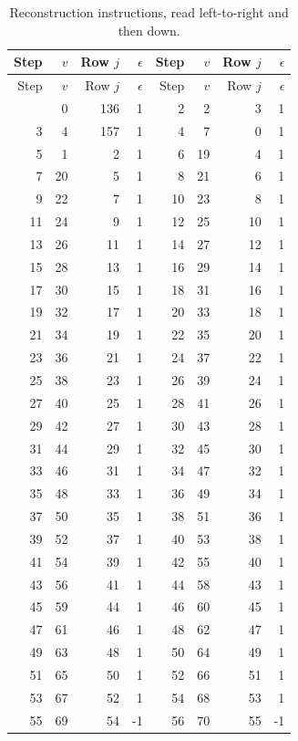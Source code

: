 \begin{longtable}{rrrr@{\qquad}rrrr}
\caption{Reconstruction instructions, read left-to-right and then down.}\label{tab:pivots}\\
\toprule
Step & $v$ & Row $j$ & $\epsilon$ & Step & $v$ & Row $j$ & $\epsilon$\\
\midrule\endfirsthead
\toprule
Step & $v$ & Row $j$ & $\epsilon$ & Step & $v$ & Row $j$ & $\epsilon$\\
\midrule\endhead
\bottomrule\endfoot
1 & 0 & 136 & 1 & 2 & 2 & 3 & 1\\
3 & 4 & 157 & 1 & 4 & 7 & 0 & 1\\
5 & 1 & 2 & 1 & 6 & 19 & 4 & 1\\
7 & 20 & 5 & 1 & 8 & 21 & 6 & 1\\
9 & 22 & 7 & 1 & 10 & 23 & 8 & 1\\
11 & 24 & 9 & 1 & 12 & 25 & 10 & 1\\
13 & 26 & 11 & 1 & 14 & 27 & 12 & 1\\
15 & 28 & 13 & 1 & 16 & 29 & 14 & 1\\
17 & 30 & 15 & 1 & 18 & 31 & 16 & 1\\
19 & 32 & 17 & 1 & 20 & 33 & 18 & 1\\
21 & 34 & 19 & 1 & 22 & 35 & 20 & 1\\
23 & 36 & 21 & 1 & 24 & 37 & 22 & 1\\
25 & 38 & 23 & 1 & 26 & 39 & 24 & 1\\
27 & 40 & 25 & 1 & 28 & 41 & 26 & 1\\
29 & 42 & 27 & 1 & 30 & 43 & 28 & 1\\
31 & 44 & 29 & 1 & 32 & 45 & 30 & 1\\
33 & 46 & 31 & 1 & 34 & 47 & 32 & 1\\
35 & 48 & 33 & 1 & 36 & 49 & 34 & 1\\
37 & 50 & 35 & 1 & 38 & 51 & 36 & 1\\
39 & 52 & 37 & 1 & 40 & 53 & 38 & 1\\
41 & 54 & 39 & 1 & 42 & 55 & 40 & 1\\
43 & 56 & 41 & 1 & 44 & 58 & 43 & 1\\
45 & 59 & 44 & 1 & 46 & 60 & 45 & 1\\
47 & 61 & 46 & 1 & 48 & 62 & 47 & 1\\
49 & 63 & 48 & 1 & 50 & 64 & 49 & 1\\
51 & 65 & 50 & 1 & 52 & 66 & 51 & 1\\
53 & 67 & 52 & 1 & 54 & 68 & 53 & 1\\
55 & 69 & 54 & -1 & 56 & 70 & 55 & -1\\

\end{longtable}
